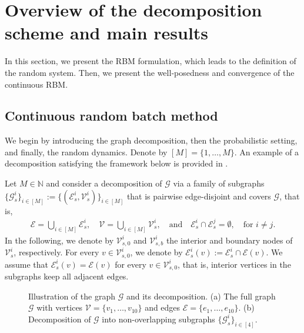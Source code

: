 \documentclass[10pt,a4paper]{amsart}
\def\N{\mathbb N}
\begin{document}
 


\section{Overview of the decomposition scheme and main results}\label{sec:overview}

In this section,  we present the RBM formulation, which leads to the definition of the random system. Then, we present the well‐posedness and convergence of the continuous RBM.

\subsection{Continuous random batch method}\label{sec:introduction_rbm}

We begin by introducing the graph decomposition, then the probabilistic setting, and finally, the random dynamics. Denote by $[M]=\{1,\dots,M\}$. An example of a decomposition satisfying the framework below is provided in .
\medbreak

 Let $M\in \N$ and consider a decomposition of $\mathcal{G}$ via a family of subgraphs $\{\mathcal{G}_s^i\}_{i\in[M]} := \{(\mathcal{E}_s^i, \mathcal{V}_s^i)\}_{i\in[M]}$ that is pairwise edge-disjoint and covers $\mathcal{G}$, that is, 
\begin{align*}
    \mathcal{E} = \bigcup_{i\in [M]} \mathcal{E}_s^i,\quad \mathcal{V} = \bigcup_{i\in [M]} \mathcal{V}_s^i, \quad \text{and}\quad \mathcal{E}_s^i\cap \mathcal{E}_s^j = \emptyset,\quad\text{for }i\neq j. 
\end{align*}
In the following, we denote by $\mathcal{V}_{s,0}^i$ and $\mathcal{V}_{s,b}^i$ the interior and boundary nodes of $\mathcal{V}_s^i$, respectively. For every $v\in \mathcal{V}_{s,0}^i$, we denote by $\mathcal E_s^i(v):=\mathcal E_s^i\cap\mathcal E(v)$. We assume that $\mathcal{E}^i_s(v)=\mathcal{E}(v)$ for every $v\in \mathcal{V}_{s,0}^i$, that is, interior vertices in the subgraphs keep all adjacent edges.
\begin{figure}[h]
\centering

\caption{Illustration of the graph $\mathcal{G}$ and its decomposition. (a) The full graph $\mathcal{G}$ with vertices $\mathcal{V} = \{v_1, \dots, v_{10}\}$ and edges $\mathcal{E} = \{e_1, \dots, e_{10}\}$. (b) Decomposition of $\mathcal{G}$ into non-overlapping subgraphs $\{\mathcal{G}_s^i\}_{i\in[4]}$.}\label{fig_1_deamon_graph}
\end{figure}
\end{document}
